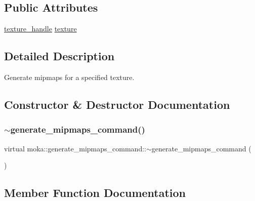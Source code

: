 \subsection*{Public Attributes}
\begin{DoxyCompactItemize}
\item 
\mbox{\hyperlink{structmoka_1_1texture__handle}{texture\+\_\+handle}} \mbox{\hyperlink{classmoka_1_1generate__mipmaps__command_aef2a378b2152cf24609a979a0673358a}{texture}}
\end{DoxyCompactItemize}


\subsection{Detailed Description}
Generate mipmaps for a specified texture. 

\subsection{Constructor \& Destructor Documentation}
\mbox{\label{classmoka_1_1generate__mipmaps__command_ac8755ed629caa3c80dbe3e5069cf6279}} 
\subsubsection{\texorpdfstring{$\sim$generate\_mipmaps\_command()}{~generate\_mipmaps\_command()}}
{\footnotesize\ttfamily virtual moka\+::generate\+\_\+mipmaps\+\_\+command\+::$\sim$generate\+\_\+mipmaps\+\_\+command (\begin{DoxyParamCaption}{ }\end{DoxyParamCaption})\hspace{0.3cm}{\ttfamily [virtual]}}



\subsection{Member Function Documentation}
\mbox{\label{classmoka_1_1generate__mipmaps__command_af04e36f3f51d7ba505c3f157ceefb42c}} 
